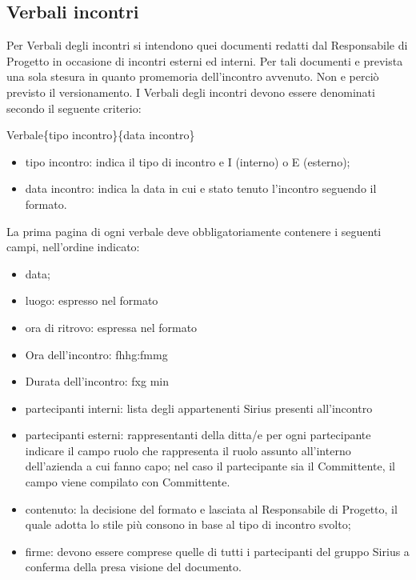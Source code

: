 \subsection{Verbali incontri}

Per Verbali degli incontri si intendono quei documenti redatti dal Responsabile di Progetto in occasione di incontri esterni ed interni.
Per tali documenti e prevista una sola stesura in quanto promemoria dell'incontro avvenuto.
Non e perciò previsto il versionamento.
I Verbali degli incontri devono essere denominati secondo il seguente criterio:

\begin{center}
Verbale\{tipo incontro\}\{data incontro\}
\end{center}

\begin{itemize}
\item tipo incontro: indica il tipo di incontro e I (interno) o E (esterno);
\item data incontro: indica la data in cui  e stato tenuto l'incontro seguendo il formato.
\end{itemize}
  
  
La prima pagina di ogni verbale deve obbligatoriamente contenere i seguenti campi, nell'ordine indicato:

\begin{itemize}
\item data;
\item luogo: espresso nel formato
\item ora di ritrovo: espressa nel formato
\item Ora dell'incontro: fhhg:fmmg
\item Durata dell'incontro: fxg min
\item partecipanti interni: lista degli appartenenti Sirius presenti all'incontro
\item partecipanti esterni: rappresentanti della ditta/e per ogni partecipante indicare il campo ruolo che rappresenta il ruolo assunto all'interno dell'azienda a cui fanno capo; nel caso il partecipante sia il Committente, il campo viene compilato con Committente.
\item contenuto: la decisione del formato  e lasciata al Responsabile di Progetto, il quale adotta lo stile più consono in base al tipo di incontro svolto;
\item firme: devono essere comprese quelle di tutti i partecipanti del gruppo Sirius a conferma della presa visione del documento.
\end{itemize}

